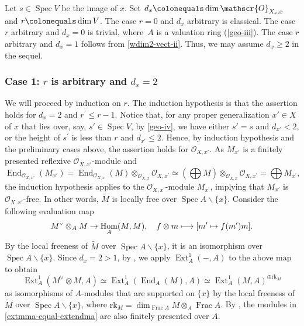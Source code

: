 \documentclass[JEP,XML,SOM,Unicode,published]{cedram}
\newcommand\mto{\mathchoice{\longmapsto}{\mapsto}{\mapsto}{\mapsto}}
\let\oldvee\vee
\renewcommand{\vee}{{\scriptscriptstyle\oldvee}}
\let\backslash\smallsetminus
\newcommand{\sO}{\mathscr{O}}
\let\wt\widetilde
\let\ce\colonequals
\let\q\quad
\newcommand{\pr}{^{\prime}}
\DeclareMathOperator{\Spec}{Spec}
\DeclareMathOperator{\Hom}{Hom}
\DeclareMathOperator{\Frac}{Frac}
\DeclareMathOperator{\Ext}{Ext}
\DeclareMathOperator{\End}{End}
\theoremstyle{plain}
\theoremstyle{definition}
\begin{document}
Let $s\in \Spec V$ be the image of $x$. Set $d_x\ce \dim \sO_{X_s,x}$ and $r\ce \dim V$. The case $r=0$ and $d_x$ arbitrary is classical. The case $r$ arbitrary and $d_x=0$ is trivial, where~$A$ is a valuation ring (\eqref{geo-iii}). The case $r$ arbitrary and $d_x=1$ follows from \eqref{wdim2-vect-ii}.
Thus, we may assume $d_x\ge 2$ in the sequel.

\subsubsection*{Case 1: $r$ is arbitrary and $d_x=2$}
We will proceed by induction on $r$. The induction hypothesis is that the assertion holds for $d_x=2$ and $r\pr\leq r-1$. Notice that, for any proper generalization $x'\in X$ of $x$ that lies over, say, $s'\in \Spec V$, by \eqref{geo-iv}, we have either $s'=s$ and $d_{x'}<2$, or the height of $s\pr$ is less than $r$ and $d_{x'}\le 2$.
Hence, by induction hypothesis and the preliminary cases above, the assertion holds for $\sO_{X,x'}$.
As $M_{x'}$ is a finitely presented reflexive $\sO_{X,x'}$\nobreakdash-mod\-ule and
\[
\End_{\sO_{X,x'}}(M_{x'})=\End_{\sO_{X,x}}(M)\otimes_{\sO_{X,x}}\sO_{X,x\pr} \simeq (\bigoplus M)\otimes_{\sO_{X,x}}\sO_{X,x\pr}=\bigoplus M_{x\pr},
\]
the induction hypothesis applies to the $\sO_{X,x\pr}$\nobreakdash-mod\-ule $M_{x\pr}$, implying that $M_{x'}$ is $\sO_{X,x'}$-free. In other words, $\widetilde{M}$ is locally free over $\Spec A \backslash \{x\}$. Consider the following evaluation map
\[
M^{\vee}\otimes_A M\to \Hom_A(M,M), \q f\otimes m\mto [m\pr \mapsto f(m\pr )m].
\]
By the local freeness of $\widetilde{M}$ over $\Spec A\backslash \{x\}$, it is an isomorphism over $\Spec A\backslash \{x\}$.
Since $d_x=2>1$, by , we apply $\Ext_A^1(-,A)$ to the above map to obtain
\begin{equation}\label{extmma-equal-extendma}
\Ext^1_A(M^{\vee}\otimes M, A) \simeq \Ext_A^1(\End_A(M),A)\simeq \Ext^1_A(M,A)^{\oplus \mathrm{rk}_M}
\end{equation}
as isomorphisms of $A$\nobreakdash-mod\-ules that are supported on $\{x\}$ by the local freeness of $\wt{M}$ over $\Spec A\backslash \{x\}$, where $\mathrm{rk}_M=\dim_{\Frac A}M\otimes_A\Frac A$.
By , the modules in \eqref{extmma-equal-extendma} are also finitely presented over $A$.
\end{document}
